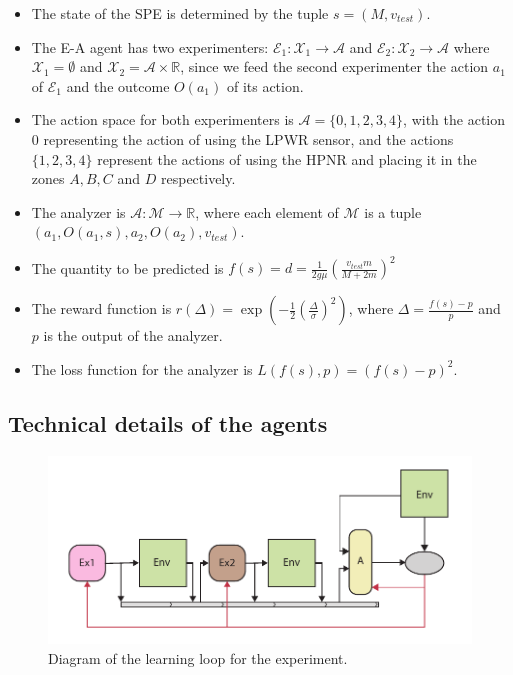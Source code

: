 \documentclass[11pt,a4paper,twoside]{report}
\newcommand{\+}{\textnormal{+} }
\theoremstyle{definition}
\numberwithin{equation}{chapter}
\begin{document}
\begin{itemize}
  \item The state of the SPE is determined by the tuple $s=(M,v_{test})$.
  \item The E-A agent has two experimenters: $\mathscr{E}_1:\mathcal{X}_1
  \rightarrow\mathcal{A}$ and $\mathscr{E}_2:\mathcal{X}_2 \rightarrow\mathcal{A}$ where
  $\mathcal{X}_1=\emptyset$ and $\mathcal{X}_2=\mathcal{A}\times \mathbb{R}$,
  since we feed the second experimenter the action $a_1$ of $\mathscr{E}_1$ and the
  outcome $O(a_1)$ of its action.
  \item The action space for both experimenters is $\mathcal{A}=\{0,1,2,3,4\}$, 
  with the action $0$ representing the action of using the LPWR sensor, and
  the actions $\{1,2,3,4\}$ represent the actions of using the HPNR and placing 
  it in the zones $A, B, C$ and $D$ respectively.
  \item The analyzer is $\mathscr{A}:\mathcal{M}\rightarrow \mathbb{R}$, where each element
  of $\mathcal{M}$ is a tuple \\
  $\left(a_1,O(a_1,s),a_2,O(a_2),v_{test}\right)$.
  \item The quantity to be predicted is
  $f(s)=d=\frac{1}{2g\mu}\left(\frac{v_{test}m}{M+2m} \right)^2$
  \item The reward function is 
  $r(\Delta)=\exp\left(-\frac{1}{2}\left( \frac{\Delta}{\sigma} \right)
  ^2\right)$, where $\Delta = \frac{f(s)-p}{p}$ and $p$ is the output of the
  analyzer.
  \item The loss function for the analyzer is $L(f(s),p)=(f(s)-p)^2$.
\end{itemize}

\subsection{Technical details of the agents}
\begin{figure}[H]
  \includegraphics[width=\columnwidth]{figures/Two-sensors.pdf}
  \caption{Diagram of the learning loop for the experiment.}
\end{figure}
\end{document}
